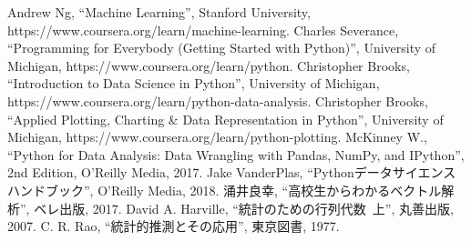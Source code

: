 \begin{thebibliography}{99}
 Andrew Ng, ``Machine Learning'', Stanford University, https://www.coursera.org/learn/machine-learning.
 Charles Severance, ``Programming for Everybody (Getting Started with Python)'', University of Michigan, https://www.coursera.org/learn/python.
 Christopher Brooks, ``Introduction to Data Science in Python'', University of Michigan, https://www.coursera.org/learn/python-data-analysis.
 Christopher Brooks, ``Applied Plotting, Charting \& Data Representation in Python'', University of Michigan, https://www.coursera.org/learn/python-plotting.
 McKinney W., ``Python for Data Analysis: Data Wrangling with Pandas, NumPy, and IPython'', 2nd Edition, O'Reilly Media, 2017.
 Jake VanderPlas, ``Pythonデータサイエンスハンドブック'', O'Reilly Media, 2018.
 涌井良幸, ``高校生からわかるベクトル解析'', ベレ出版, 2017.
 David A. Harville, ``統計のための行列代数~上'', 丸善出版, 2007.
 C. R. Rao, ``統計的推測とその応用'', 東京図書, 1977.
\end{thebibliography}